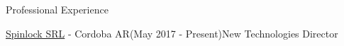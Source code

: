 \documentclass{resume}
\begin{document}
\begin{rSection}{Professional Experience}
\begin{rSubsection}{\href{https://spinlock.com.ar}{Spinlock SRL} - Cordoba AR}{(May 2017 - Present)}{New Technologies Director}{}
    

        







\end{rSubsection}
\end{rSection}
\end{document}
